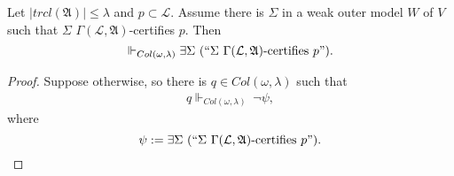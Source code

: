 \documentclass[12pt]{article}
\numberwithin{equation}{section}
\begin{document}
\begin{lem}\label{inout}
Let $|trcl(\mathfrak{A})| \leq \lambda$ and $p \subset \mathcal{L}$. Assume there is $\Sigma$ in a weak outer model $W$ of $V$ such that $\Sigma$ $\Gamma(\mathcal{L}, \mathfrak{A})$-certifies $p$. Then $$\Vdash_{Col(\omega, \lambda)} \exists \Sigma \ (``\Sigma \ \Gamma(\mathcal{L}, \mathfrak{A}) \text{-certifies } p").$$
\end{lem}

\begin{proof}
Suppose otherwise, so there is $q \in Col(\omega, \lambda)$ such that
\begin{align}
    \label{eq10} q \Vdash_{Col(\omega, \lambda)} \ \neg \psi,
\end{align}
where $$\psi := \exists \Sigma \ (``\Sigma \ \Gamma(\mathcal{L}, \mathfrak{A}) \text{-certifies } p").$$


\end{proof}
\end{document}
